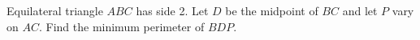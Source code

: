 Equilateral triangle $ABC$ has side 2. Let $D$ be the midpoint of $BC$ and let $P$ vary on $AC$. Find the minimum perimeter of $BDP$.
